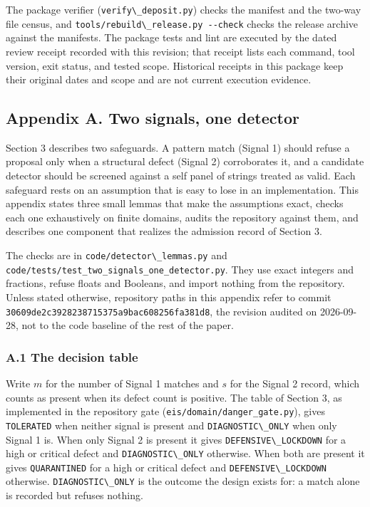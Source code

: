 \documentclass[
  11pt,
]{article}
\newcommand{\passthrough}[1]{#1}
\begin{document}
The package verifier (\passthrough{\lstinline!verify\_deposit.py!})
checks the manifest and the two-way file census, and
\passthrough{\lstinline!tools/rebuild\_release.py --check!} checks the
release archive against the manifests. The package tests and lint are
executed by the dated review receipt recorded with this revision; that
receipt lists each command, tool version, exit status, and tested scope.
Historical receipts in this package keep their original dates and scope
and are not current execution evidence.

\subsection{Appendix A. Two signals, one
detector}\label{appendix-a.-two-signals-one-detector}

Section 3 describes two safeguards. A pattern match (Signal 1) should
refuse a proposal only when a structural defect (Signal 2) corroborates
it, and a candidate detector should be screened against a self panel of
strings treated as valid. Each safeguard rests on an assumption that is
easy to lose in an implementation. This appendix states three small
lemmas that make the assumptions exact, checks each one exhaustively on
finite domains, audits the repository against them, and describes one
component that realizes the admission record of Section 3.

The checks are in \passthrough{\lstinline!code/detector\_lemmas.py!} and
\nolinkurl{code/tests/test_two_signals_one_detector.py}. They use exact
integers and fractions, refuse floats and Booleans, and import nothing
from the repository. Unless stated otherwise, repository paths in this
appendix refer to commit
\nolinkurl{30609de2c3928238715375a9bac608256fa381d8}, the revision
audited on 2026-09-28, not to the code baseline of the rest of the
paper.

\subsubsection{A.1 The decision table}\label{a.1-the-decision-table}

Write \(m\) for the number of Signal 1 matches and \(s\) for the Signal
2 record, which counts as present when its defect count is positive. The
table of Section 3, as implemented in the repository gate
(\nolinkurl{eis/domain/danger_gate.py}),
gives \passthrough{\lstinline!TOLERATED!} when neither signal is present
and \passthrough{\lstinline!DIAGNOSTIC\_ONLY!} when only Signal 1 is.
When only Signal 2 is present it gives
\passthrough{\lstinline!DEFENSIVE\_LOCKDOWN!} for a high or critical
defect and \passthrough{\lstinline!DIAGNOSTIC\_ONLY!} otherwise. When
both are present it gives \passthrough{\lstinline!QUARANTINED!} for a
high or critical defect and
\passthrough{\lstinline!DEFENSIVE\_LOCKDOWN!} otherwise.
\passthrough{\lstinline!DIAGNOSTIC\_ONLY!} is the outcome the design
exists for: a match alone is recorded but refuses nothing.
\end{document}
